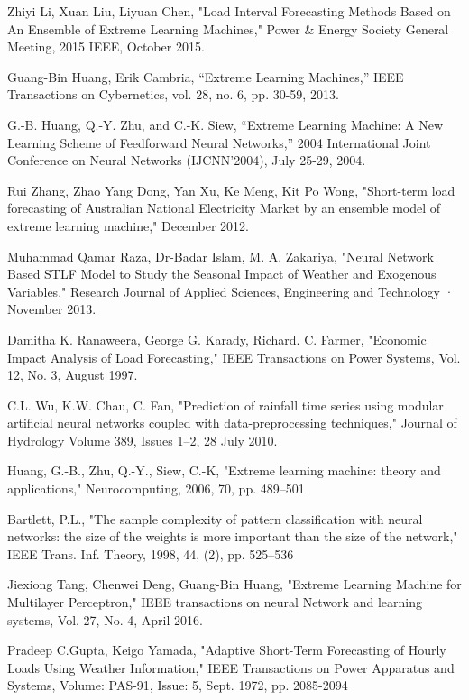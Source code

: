 \documentclass[runningheads,a4paper]{llncs}
\begin{document}
\begin{thebibliography}{4}

 Zhiyi Li, Xuan Liu, Liyuan Chen, "Load Interval Forecasting Methods Based on An Ensemble of Extreme Learning Machines," Power \& Energy Society General Meeting, 2015 IEEE, October 2015.

 Guang-Bin Huang, Erik Cambria, “Extreme Learning Machines,” IEEE Transactions on Cybernetics, vol. 28, no. 6, pp. 30-59, 2013.

 G.-B. Huang, Q.-Y. Zhu, and C.-K. Siew, “Extreme Learning Machine: A New Learning Scheme of Feedforward Neural Networks,” 2004 International Joint Conference on Neural Networks (IJCNN'2004), July 25-29, 2004.

 Rui Zhang, Zhao Yang Dong, Yan Xu, Ke Meng, Kit Po Wong, "Short-term load forecasting of Australian National Electricity Market by an ensemble model of extreme learning machine," December 2012.

 Muhammad Qamar Raza, Dr-Badar Islam, M. A. Zakariya, "Neural Network Based STLF Model to Study the Seasonal Impact of Weather and Exogenous Variables," Research Journal of Applied Sciences, Engineering and Technology · November 2013.

 Damitha K. Ranaweera, George G. Karady, Richard. C. Farmer, "Economic Impact Analysis of Load Forecasting," IEEE Transactions on Power Systems, Vol. 12, No. 3, August 1997.

 C.L. Wu, K.W. Chau, C. Fan, "Prediction of rainfall time series using modular artificial neural networks coupled with data-preprocessing techniques," Journal of Hydrology Volume 389, Issues 1–2, 28 July 2010. 

 Huang, G.-B., Zhu, Q.-Y., Siew, C.-K, "Extreme learning machine: theory and applications," Neurocomputing, 2006, 70, pp. 489–501

 Bartlett, P.L., "The sample complexity of pattern classification with neural networks: the size of the weights is more important than the size of the network," IEEE Trans. Inf. Theory, 1998, 44, (2), pp. 525–536

 Jiexiong Tang, Chenwei Deng, Guang-Bin Huang, "Extreme Learning Machine for Multilayer Perceptron," IEEE transactions on neural Network and learning systems, Vol. 27, No. 4, April 2016.

 Pradeep C.Gupta, Keigo Yamada, "Adaptive Short-Term Forecasting of Hourly Loads Using Weather Information," IEEE Transactions on Power Apparatus and Systems, Volume: PAS-91, Issue: 5, Sept. 1972, pp. 2085-2094


\end{thebibliography}
\end{document}
